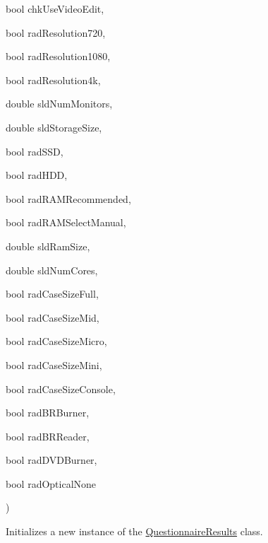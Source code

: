 {\begin{DoxyParamCaption}
\item[{bool}]{chk\+Use\+Video\+Edit, }
\item[{bool}]{rad\+Resolution720, }
\item[{bool}]{rad\+Resolution1080, }
\item[{bool}]{rad\+Resolution4k, }
\item[{double}]{sld\+Num\+Monitors, }
\item[{double}]{sld\+Storage\+Size, }
\item[{bool}]{rad\+S\+SD, }
\item[{bool}]{rad\+H\+DD, }
\item[{bool}]{rad\+R\+A\+M\+Recommended, }
\item[{bool}]{rad\+R\+A\+M\+Select\+Manual, }
\item[{double}]{sld\+Ram\+Size, }
\item[{double}]{sld\+Num\+Cores, }
\item[{bool}]{rad\+Case\+Size\+Full, }
\item[{bool}]{rad\+Case\+Size\+Mid, }
\item[{bool}]{rad\+Case\+Size\+Micro, }
\item[{bool}]{rad\+Case\+Size\+Mini, }
\item[{bool}]{rad\+Case\+Size\+Console, }
\item[{bool}]{rad\+B\+R\+Burner, }
\item[{bool}]{rad\+B\+R\+Reader, }
\item[{bool}]{rad\+D\+V\+D\+Burner, }
\item[{bool}]{rad\+Optical\+None}
\end{DoxyParamCaption}
)}\hypertarget{class_business_objects_1_1_questionnaire_results_a4e99b6de8ad5c240763baa74ebae2ca4}{}\label{class_business_objects_1_1_questionnaire_results_a4e99b6de8ad5c240763baa74ebae2ca4}


Initializes a new instance of the \hyperlink{class_business_objects_1_1_questionnaire_results}{Questionnaire\+Results} class. 


